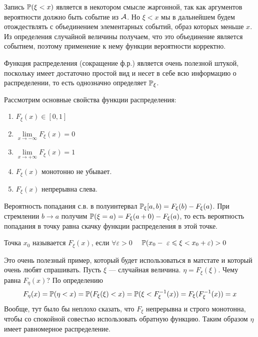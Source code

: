 \documentclass[../TV&MS.tex]{subfiles}
\begin{document}
Запись $\mathbb{P}(\xi < x)$ является в некотором смысле жаргонной, так как аргументов 
вероятности должно быть событие из $\mathcal{A}$. Но $\xi < x$ мы в дальнейшем будем 
отождествлять с объединением элементарных событий, образ которых меньше $x$. Из определения 
случайной величины получаем, что это объединение является событием,
поэтому применение к нему функции вероятности корректно.

Функция распределения (сокращение ф.р.) является очень полезной штукой, поскольку имеет 
достаточно простой вид и несет в себе всю информацию о распределении, то есть однозначно 
определяет $\mathbb{P}_\xi$.

Рассмотрим основные свойства функции распределения:
\begin{enumerate}
	\item $F_\xi(x) \in [0, 1]$
	\item $\lim\limits_{x \to -\infty} F_\xi(x) = 0$
	\item $\lim\limits_{x \to +\infty} F_\xi(x) = 1$
	\item $F_\xi(x)$ монотонно не убывает.
	\item $F_\xi(x)$ непрерывна слева.
\end{enumerate}

Вероятность попадания с.в. в полуинтервал $\mathbb{P}_\xi[a,b) = F_\xi(b) - F_\xi(a)$. При 
стремлении $b \to a$ получим $\mathbb{P}(\xi = a) = F_\xi(a+0) - F_\xi(a)$, то есть 
вероятность попадания в точку равна скачку функции распределения в этой точке.

\begin{Def}
Точка $x_0$ называется  $F_\xi(x)$, если $\forall \varepsilon > 0 \quad$
$\mathbb{P}(x_0 -~\varepsilon \leqslant \xi < x_0 + \varepsilon) > 0$
\end{Def}

\begin{Ex}
Это очень полезный пример, который будет использоваться в матстате и который очень любят спрашивать. 
Пусть $\xi$ --- случайная величина. $\eta = F_\xi(\xi)$. Чему равна $F_\eta(x)$? По определению 
\begin{equation}\label{fXiOfXi}
F_\eta(x) = \mathbb{P}(\eta < x) = \mathbb{P}(F_\xi(\xi) < x)=\mathbb{P}(\xi < F_\xi^{-1}(x)) = F_\xi(F_\xi^{-1}(x))=x
\end{equation}
Вообще, тут было бы неплохо сказать, что $F_\xi$ непрерывна и строго монотонна, чтобы со спокойной 
совестью использовать обратную функцию. Таким образом $\eta$ имеет равномерное распределение.
\end{Ex}
\end{document}
